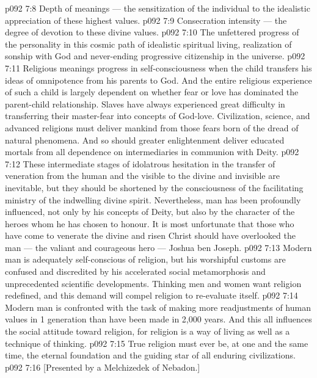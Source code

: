 \vs p092 7:8 \bibnobreakspace Depth of meanings --- the sensitization of the individual to the idealistic appreciation of these highest values.
\vs p092 7:9 \bibnobreakspace Consecration intensity --- the degree of devotion to these divine values.
\vs p092 7:10 \bibnobreakspace The unfettered progress of the personality in this cosmic path of idealistic spiritual living, realization of sonship with God and never\hyp{}ending progressive citizenship in the universe.
\vs p092 7:11 \pc Religious meanings progress in self\hyp{}consciousness when the child transfers his ideas of omnipotence from his parents to God. And the entire religious experience of such a child is largely dependent on whether fear or love has dominated the parent\hyp{}child relationship. Slaves have always experienced great difficulty in transferring their master\hyp{}fear into concepts of God\hyp{}love. Civilization, science, and advanced religions must deliver mankind from those fears born of the dread of natural phenomena. And so should greater enlightenment deliver educated mortals from all dependence on intermediaries in communion with Deity.
\vs p092 7:12 These intermediate stages of idolatrous hesitation in the transfer of veneration from the human and the visible to the divine and invisible are inevitable, but they should be shortened by the consciousness of the facilitating ministry of the indwelling divine spirit. Nevertheless, man has been profoundly influenced, not only by his concepts of Deity, but also by the character of the heroes whom he has chosen to honour. It is most unfortunate that those who have come to venerate the divine and risen Christ should have overlooked the man --- the valiant and courageous hero --- Joshua ben Joseph.
\vs p092 7:13 \pc Modern man is adequately self\hyp{}conscious of religion, but his worshipful customs are confused and discredited by his accelerated social metamorphosis and unprecedented scientific developments. Thinking men and women want religion redefined, and this demand will compel religion to re\hyp{}evaluate itself.
\vs p092 7:14 Modern man is confronted with the task of making more readjustments of human values in 1 generation than have been made in 2,000 years. And this all influences the social attitude toward religion, for religion is a way of living as well as a technique of thinking.
\vs p092 7:15 \pc True religion must ever be, at one and the same time, the eternal foundation and the guiding star of all enduring civilizations.
\vsetoff
\vs p092 7:16 [Presented by a Melchizedek of Nebadon.]
\quizlink

